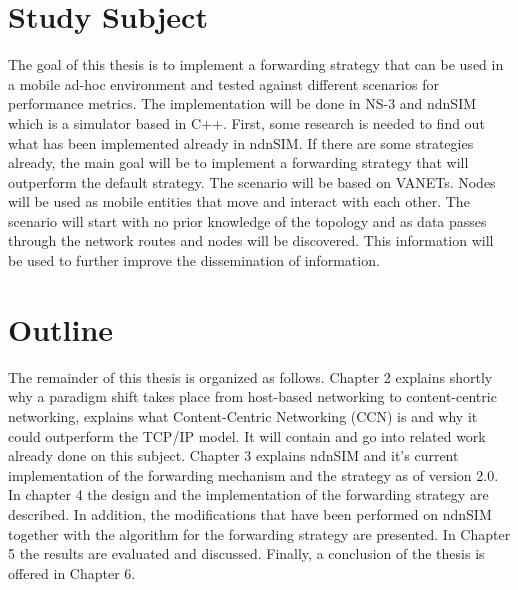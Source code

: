\section{Study Subject}

The goal of this thesis is to implement a forwarding strategy that can be used in a mobile ad-hoc environment and tested against different scenarios for performance metrics. The implementation will be done in NS-3 and ndnSIM which is a simulator based in C++. First, some research is needed to find out what has been implemented already in ndnSIM. If there are some strategies already, the main goal will be to implement a forwarding strategy that will outperform the default strategy. The scenario will be based on VANETs. Nodes will be used as mobile entities that move and interact with each other. The scenario will start with no prior knowledge of the topology and as data passes through the network routes and nodes will be discovered. This information will be used to further improve the dissemination of information.

\section{Outline}

The remainder of this thesis is organized as follows. Chapter 2 explains shortly why a paradigm shift takes place from host-based networking to content-centric networking, explains what Content-Centric Networking (CCN) is and why it could outperform the TCP/IP model. It will contain and go into related work already done on this subject. Chapter 3 explains ndnSIM and it's current implementation of the forwarding mechanism and the strategy as of version 2.0. In chapter 4 the design and the implementation of the forwarding strategy are described. In addition, the modifications that have been performed on ndnSIM together with the algorithm for the forwarding strategy are presented. In Chapter 5 the results are evaluated and discussed. Finally, a conclusion of the thesis is offered in Chapter 6.